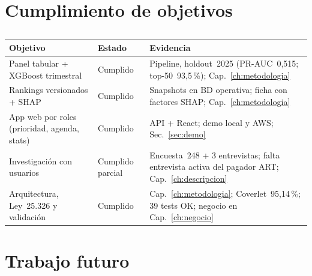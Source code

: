 \section{Cumplimiento de objetivos}



\begin{table}[htbp]
	\centering
	\caption{ \fuentepropia}
	\label{tab:cumplimiento-objetivos}
	\small
	\begin{tabular}{@{}p{}p{}p{}@{}}
		\hline
		\textbf{Objetivo} & \textbf{Estado} & \textbf{Evidencia} \\
		\hline
		Panel tabular + XGBoost trimestral & Cumplido & Pipeline, holdout~2025 (PR-AUC~0,515; top-50~93,5\,\%); Cap.~\ref{ch:metodologia} \\
		Rankings versionados + SHAP & Cumplido & Snapshots en BD operativa; ficha con factores SHAP; Cap.~\ref{ch:metodologia} \\
		App web por roles (prioridad, agenda, stats) & Cumplido & API + React; demo local y AWS; Sec.~\ref{sec:demo} \\
		Investigaci\'on con usuarios & Cumplido parcial & Encuesta~248 + 3 entrevistas; falta entrevista activa del pagador ART; Cap.~\ref{ch:descripcion} \\
		Arquitectura, Ley~25.326 y validaci\'on & Cumplido & Cap.~\ref{ch:metodologia}; Coverlet~95,14\,\%; 39 tests OK; negocio en Cap.~\ref{ch:negocio} \\
		\hline
	\end{tabular}
\end{table}

\section{Trabajo futuro}

